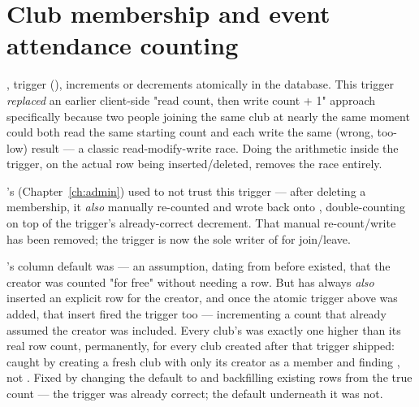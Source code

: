 \section{Club membership and event attendance counting}

, trigger  (), increments or decrements  atomically in the database. This trigger \emph{replaced} an earlier client-side "read count, then write count + 1" approach specifically because two people joining the same club at nearly the same moment could both read the same starting count and each write the same (wrong, too-low) result — a classic read-modify-write race. Doing the arithmetic inside the trigger, on the actual row being inserted/deleted, removes the race entirely.

\begin{olknote}
's  (Chapter~\ref{ch:admin}) used to not trust this trigger — after deleting a membership, it \emph{also} manually re-counted  and wrote  back onto , double-counting on top of the trigger's already-correct decrement. That manual re-count/write has been removed; the trigger is now the sole writer of  for join/leave.
\end{olknote}

\begin{olkgotcha}
's column default was  — an assumption, dating from before  existed, that the creator was counted "for free" without needing a  row. But  has always \emph{also} inserted an explicit  row for the creator, and once the atomic trigger above was added, that insert fired the trigger too — incrementing a count that already assumed the creator was included. Every club's  was exactly one higher than its real  row count, permanently, for every club created after that trigger shipped: caught by creating a fresh club with only its creator as a member and finding , not . Fixed by changing the default to  and backfilling existing rows from the true count — the trigger was already correct; the default underneath it was not.
\end{olkgotcha}

